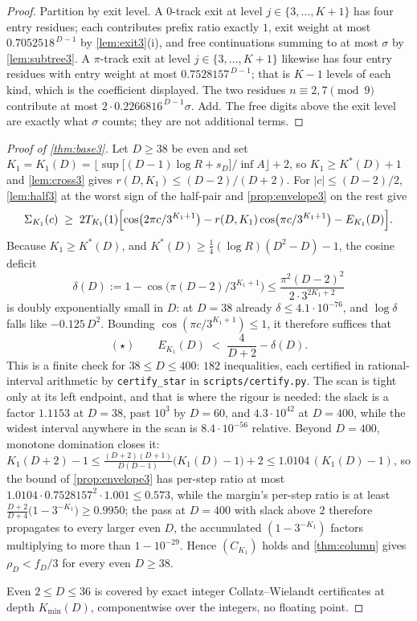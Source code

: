 \documentclass[11pt]{amsart}
\theoremstyle{definition}
\theoremstyle{remark}
\begin{document}
\begin{proof}
Partition by exit level. A $0$-track exit at level $j \in \{3,\dots,K+1\}$ has four entry residues; each contributes prefix ratio exactly $1$, exit weight at most $0.7052518^{\,D-1}$ by \cref{lem:exit3}(i), and free continuations summing to at most $\sigma$ by \cref{lem:subtree3}. A $\pi$-track exit at level $j \in \{3,\dots,K+1\}$ likewise has four entry residues with entry weight at most $0.7528157^{\,D-1}$; that is $K - 1$ levels of each kind, which is the coefficient displayed. The two residues $n \equiv 2,7 \pmod 9$ contribute at most $2\cdot 0.2266816^{\,D-1}\sigma$. Add. The free digits above the exit level are exactly what $\sigma$ counts; they are not additional terms.
\end{proof}

\begin{proof}[Proof of \cref{thm:base3}]
Let $D \ge 38$ be even and set $K_1 = K_1(D) = \bigl\lfloor \sup\bigl[(D-1)\log R + s_D\bigr]/\inf A\bigr\rfloor + 2$, so $K_1 \ge K^{*}(D) + 1$ and \cref{lem:cross3} gives $r(D,K_1) \le (D-2)/(D+2)$. For $\lvert c \rvert \le (D-2)/2$, \cref{lem:half3} at the worst sign of the half-pair and \cref{prop:envelope3} on the rest give
\[
  \Sigma_{K_1}(c) \;\ge\; 2T_{K_1}(1)\Bigl[\cos\bigl(2\pi c/3^{K_1+1}\bigr) - r(D,K_1)\cos\bigl(\pi c/3^{K_1+1}\bigr) - E_{K_1}(D)\Bigr].
\]
Because $K_1 \ge K^{*}(D)$, and $K^{*}(D) \ge \tfrac14(\log R)(D^2 - D) - 1$, the cosine deficit
\[
  \delta(D) := 1 - \cos\bigl(\pi(D-2)/3^{K_1+1}\bigr) \le \frac{\pi^2(D-2)^2}{2\cdot 3^{2K_1+2}}
\]
is doubly exponentially small in $D$: at $D = 38$ already $\delta \le 4.1\cdot10^{-76}$, and $\log\delta$ falls like $-0.125\,D^2$. Bounding $\cos(\pi c/3^{K_1+1}) \le 1$, it therefore suffices that
\[
  (\star) \qquad E_{K_1}(D) \;<\; \frac{4}{D+2} - \delta(D).
\]
This is a finite check for $38 \le D \le 400$: $182$ inequalities, each certified in rational-interval arithmetic by \texttt{certify\_star} in \texttt{scripts/certify.py}. The scan is tight only at its left endpoint, and that is where the rigour is needed: the slack is a factor $1.1153$ at $D = 38$, past $10^{3}$ by $D = 60$, and $4.3\cdot 10^{42}$ at $D = 400$, while the widest interval anywhere in the scan is $8.4 \cdot 10^{-56}$ relative. Beyond $D = 400$, monotone domination closes it: $K_1(D+2) - 1 \le \tfrac{(D+2)(D+1)}{D(D-1)}\bigl(K_1(D)-1\bigr) + 2 \le 1.0104\,(K_1(D)-1)$, so the bound of \cref{prop:envelope3} has per-step ratio at most $1.0104 \cdot 0.7528157^2 \cdot 1.001 \le 0.573$, while the margin's per-step ratio is at least $\tfrac{D+2}{D+4}\bigl(1 - 3^{-K_1}\bigr) \ge 0.9950$; the pass at $D = 400$ with slack above $2$ therefore propagates to every larger even $D$, the accumulated $(1-3^{-K_1})$ factors multiplying to more than $1 - 10^{-29}$. Hence $(C_{K_1})$ holds and \cref{thm:column} gives $\rho_D < f_D/3$ for every even $D \ge 38$.

Even $2 \le D \le 36$ is covered by exact integer Collatz--Wielandt certificates at depth $K_{\min}(D)$, componentwise over the integers, no floating point.
\end{proof}
\end{document}
